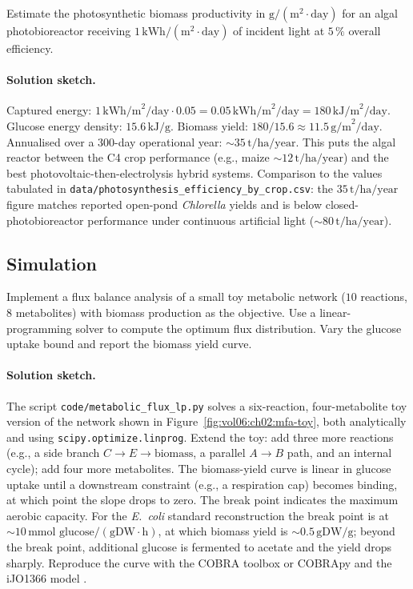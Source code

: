\begin{exercise}
Estimate the photosynthetic biomass productivity in
$\text{g}/(\text{m}^2 \cdot \text{day})$ for an algal
photobioreactor receiving $1\,\text{kWh}/(\text{m}^2 \cdot \text{day})$
of incident light at $5\,\%$ overall efficiency.
\end{exercise}

\paragraph{Solution sketch.}
Captured energy: $1\,\text{kWh/m}^2/\text{day} \cdot 0.05 = 0.05\,
\text{kWh/m}^2/\text{day} = 180\,\text{kJ/m}^2/\text{day}$. Glucose
energy density: $15.6\,\text{kJ/g}$. Biomass yield: $180/15.6 \approx
11.5\,\text{g/m}^2/\text{day}$. Annualised over a $300$-day operational
year: $\sim 35\,\text{t/ha/year}$. This puts the algal reactor between
the C4 crop performance (e.g., maize $\sim 12\,\text{t/ha/year}$) and
the best photovoltaic-then-electrolysis hybrid systems. Comparison to
the values tabulated in \texttt{data/photosynthesis\_efficiency\_by\_crop.csv}:
the $35\,\text{t/ha/year}$ figure matches reported open-pond
\emph{Chlorella} yields and is below closed-photobioreactor performance
under continuous artificial light ($\sim 80\,\text{t/ha/year}$).

\subsection*{Simulation}

\begin{exercise}
Implement a flux balance analysis of a small toy metabolic network
($10$ reactions, $8$ metabolites) with biomass production as the
objective. Use a linear-programming solver to compute the optimum
flux distribution. Vary the glucose uptake bound and report the
biomass yield curve.
\end{exercise}

\paragraph{Solution sketch.}
The script \texttt{code/metabolic\_flux\_lp.py} solves a
six-reaction, four-metabolite toy version of the network shown in
Figure~\ref{fig:vol06:ch02:mfa-toy}, both analytically and using
\texttt{scipy.optimize.linprog}. Extend the toy: add three more
reactions (e.g., a side branch $C \to E \to \text{biomass}$, a
parallel $A \to B$ path, and an internal cycle); add four more
metabolites. The biomass-yield curve is linear in glucose uptake
until a downstream constraint (e.g., a respiration cap) becomes
binding, at which point the slope drops to zero. The break point
indicates the maximum aerobic capacity. For the \emph{E.~coli}
standard reconstruction the break point is at $\sim 10\,\text{mmol
glucose}/(\text{gDW} \cdot \text{h})$, at which biomass yield is
$\sim 0.5\,\text{gDW/g}$; beyond the break point, additional glucose
is fermented to acetate and the yield drops sharply. Reproduce the
curve with the COBRA toolbox or COBRApy and the iJO1366 model
\cite{paper:v6c02-orth-cobra-2010}.

